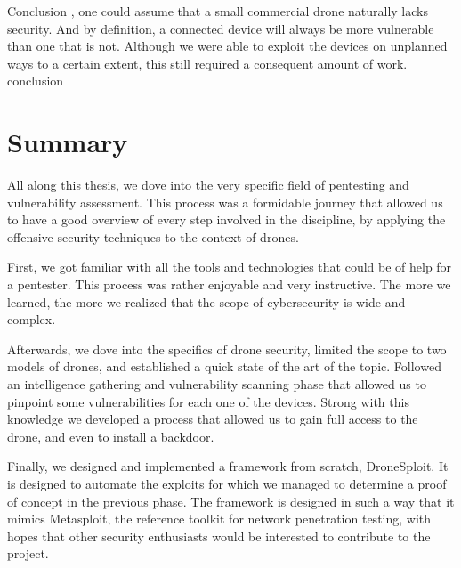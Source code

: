\begin{chaptercover}{Conclusion}%
{
{\large \vspace{-1.5cm}  , one could assume that a small commercial drone naturally lacks security. And by definition, a connected device will always be more vulnerable than one that is not. Although we were able to exploit the devices on unplanned ways to a certain extent, this still required a consequent amount of work.  \newline \\}}%
{conclusion}

\section{Summary}
All along this thesis, we dove into the very specific field of pentesting and vulnerability assessment. This process was a formidable journey that allowed us to have a good overview of every step involved in the discipline, by applying the offensive security techniques to the context of drones.

First, we got familiar with all the tools and technologies that could be of help for a pentester. This process was rather enjoyable and very instructive. The more we learned, the more we realized that the scope of cybersecurity is wide and complex.

Afterwards, we dove into the specifics of drone security, limited the scope to two models of drones, and established a quick state of the art of the topic. Followed an intelligence gathering and vulnerability scanning phase that allowed us to pinpoint some vulnerabilities for each one of the devices. Strong with this knowledge we developed a process that allowed us to gain full access to the drone, and even to install a backdoor.

Finally, we designed and implemented a framework from scratch, DroneSploit. It is designed to automate the exploits for which we managed to determine a proof of concept in the previous phase. The framework is designed in such a way that it mimics Metasploit, the reference toolkit for network penetration testing, with hopes that other security enthusiasts would be interested to contribute to the project.


\end{chaptercover}

